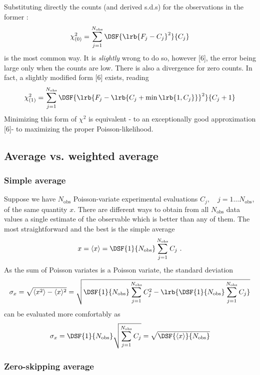 Substituting directly the counts (and derived s.d.s) for the observations in the former :
\[
\chi_{(0)}^2 = \mathop{\sum}_{j=1}^{N_{\mathrm{obs}}}
\DSF{\lrb{F_j-C_j}^2
}{
C_j
}
\]
is the most common way. It is \emph{slightly} wrong to do so, however [6], 
the error being large only when the counts are low. 
There is also a divergence for zero counts. 
In fact, a slightly modified form [6] exists, reading
\[
\chi_{(1)}^2 = \mathop{\sum}_{j=1}^{N_{\mathrm{obs}}}
\DSF{\lrb{F_j-\lrb{C_j+\min\lrb{1,C_j}}}^2
}{
C_j+1
}
\]
Minimizing this form of $\chi^2$ is equivalent - to an exceptionally good approximation [6]- 
to maximizing the proper Poisson-likelihood. 











\subsection{Average vs. weighted average}

\subsubsection{Simple average}

Suppose we have $N_{\mathrm{obs}}$ Poisson-variate experimental evaluations 
$C_j,\quad j=1\ldots N_{\mathrm{obs}}$, 
of the same quantity $x$.
There are different ways to obtain from all $N_{\mathrm{obs}}$ data values a single estimate of the observable which is better than 
any of them. The most straightforward and the best is the simple average
\[
x=\langle x\rangle=\DSF{1}{ N_{\mathrm{obs}}}
 \mathop{\sum}_{j=1}^{N_{\mathrm{obs}}}C_j\ .
\]
As the sum of Poisson variates is a Poisson variate, the standard deviation 
\[
\sigma_x=\sqrt{\langle x^2\rangle-\langle x\rangle^2}=\sqrt{
\DSF{1}{ N_{\mathrm{obs}}}
 \mathop{\sum}_{j=1}^{N_{\mathrm{obs}}}C_j^2-\lrb{
 \DSF{1}{ N_{\mathrm{obs}}}
 \mathop{\sum}_{j=1}^{N_{\mathrm{obs}}}C_j
 }
 }
\]
can be evaluated more comfortably as
\[
\sigma_x=\DSF{1}{ N_{\mathrm{obs}}}\sqrt{  \mathop{\sum}_{j=1}^{N_{\mathrm{obs}}}C_j }
=\sqrt{\DSF{\langle x\rangle}{N_{\mathrm{obs}}}}
\]


\subsubsection{Zero-skipping average}

